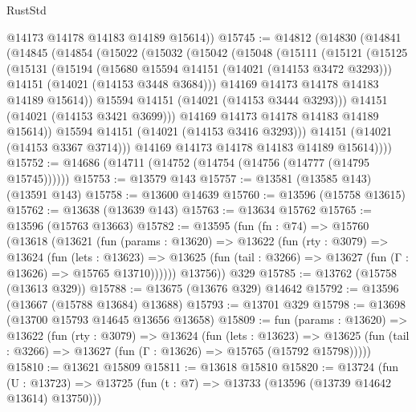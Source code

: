 \begin{lexlean}{RustStd}
\begin{coremodule}
{\begin{coremodule}
{{{{{{{{{{{{{{{{{{{{{{{{{{{{{{{{{{{{{{{        @14173
        @14178
        @14183
        @14189
        @15614))
@15745 := @14812
    (@14830
      (@14841
        (@14845
          (@14854
            (@15022
              (@15032
                (@15042
                  (@15048
                    (@15111
                      (@15121
                        (@15125
                          (@15131
                            (@15194
                              (@15680 @15594 @14151 (@14021 (@14153 @3472 @3293)))
                              @14151
                              (@14021 (@14153 @3448 @3684)))
                            @14169
                            @14173
                            @14178
                            @14183
                            @14189
                            @15614))
                        @15594
                        @14151
                        (@14021 (@14153 @3444 @3293)))
                      @14151
                      (@14021 (@14153 @3421 @3699)))
                    @14169
                    @14173
                    @14178
                    @14183
                    @14189
                    @15614))
                @15594
                @14151
                (@14021 (@14153 @3416 @3293)))
              @14151
              (@14021 (@14153 @3367 @3714)))
            @14169
            @14173
            @14178
            @14183
            @14189
            @15614))))
@15752 := @14686 (@14711 (@14752 (@14754 (@14756 (@14777 (@14795 @15745))))))
@15753 := @13579 @143
@15757 := @13581 (@13585 @143) (@13591 @143)
@15758 := @13600 @14639
@15760 := @13596 (@15758 @13615)
@15762 := @13638 (@13639 @143)
@15763 := @13634 @15762
@15765 := @13596 (@15763 @13663)
@15782 := @13595
    (fun (fn : @74) =>
    @15760
      (@13618
        (@13621
          (fun (params : @13620) =>
          @13622
            (fun (rty : @3079) =>
            @13624
              (fun (lets : @13623) =>
              @13625 (fun (tail : @3266) => @13627 (fun (Γ : @13626) => @15765 @13710))))))
        @13756))
    @329
@15785 := @13762 (@15758 (@13613 @329))
@15788 := @13675 (@13676 @329) @14642
@15792 := @13596 (@13667 (@15788 @13684) @13688)
@15793 := @13701 @329
@15798 := @13698 (@13700 @15793 @14645 @13656 @13658)
@15809 := fun (params : @13620) =>
  @13622
    (fun (rty : @3079) =>
    @13624
      (fun (lets : @13623) =>
      @13625 (fun (tail : @3266) => @13627 (fun (Γ : @13626) => @15765 (@15792 @15798)))))
@15810 := @13621 @15809
@15811 := @13618 @15810
@15820 := @13724
    (fun (U : @13723) => @13725 (fun (t : @7) => @13733 (@13596 (@13739 @14642 @13614) @13750)))
}}}}}}}}}}}}}}}}}}}}}}}}}}}}}}}}}}}}}}}
\end{coremodule}}
\end{coremodule}
\end{lexlean}
